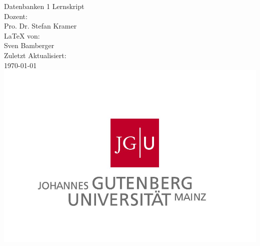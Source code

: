 \begin{titlepage}
\center
\Large Datenbanken 1 Lernskript \\[2em]
Dozent:\\Pro. Dr. Stefan Kramer \\[2em]
\LaTeX{} von:\\Sven Bamberger\\[2em]
Zuletzt Aktualisiert:\\\today\\
\includegraphics[scale=.2]{front/pics/Logo.jpg}\\\quad\\
\end{titlepage}
